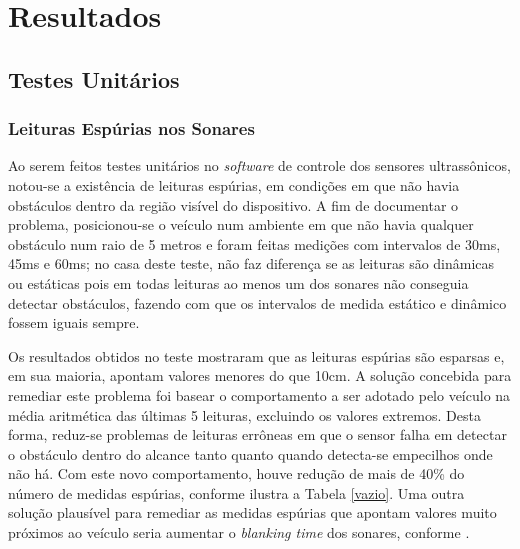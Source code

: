 \chapter{Resultados}

\section{Testes Unitários}

\subsection{Leituras Espúrias nos Sonares}
Ao serem feitos testes unitários no \textit{software} de controle dos sensores ultrassônicos, notou-se a existência de leituras espúrias, em 
condições em que não havia obstáculos dentro da região visível do dispositivo.
A fim de documentar o problema, posicionou-se o veículo num ambiente em que não havia qualquer obstáculo num raio de 5 metros e foram feitas medições 
com intervalos de 30ms, 45ms e 60ms; no casa deste teste, não faz diferença se as leituras são dinâmicas ou estáticas pois em todas leituras ao menos 
um dos sonares não conseguia detectar obstáculos, fazendo com que os intervalos de medida estático e dinâmico fossem iguais sempre.

Os resultados obtidos no teste mostraram que as leituras espúrias são esparsas e, em sua maioria, apontam valores menores do que 10cm.
A solução concebida para remediar este problema foi basear o comportamento a ser adotado pelo veículo na média aritmética das últimas 5 leituras, 
excluindo os valores extremos. 
Desta forma, reduz-se problemas de leituras errôneas em que o sensor falha em detectar o obstáculo dentro do alcance tanto quanto quando detecta-se 
empecilhos onde não há.
Com este novo comportamento, houve redução de mais de 40\% do número de medidas espúrias, conforme ilustra a Tabela \ref{vazio}.
Uma outra solução plausível para remediar as medidas espúrias que apontam valores muito próximos ao veículo seria aumentar o \textit{blanking time} 
dos sonares, conforme \cite{siegwart}.

